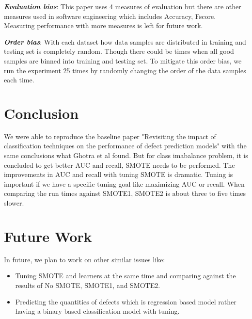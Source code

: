 \documentclass[sigconf]{acmart}
\theoremstyle{break}
\begin{document}
\textbf{\textit{Evaluation bias}}: This paper uses 4 measures of evaluation but there are other measures used in software engineering which includes Accuracy, Fscore. Measuring performance with more measures is left for future work.

\textbf{\textit{Order bias}}: With each dataset how data samples are distributed in training and testing set is completely random. Though there could be times when all good samples are binned into training and testing set. To mitigate this order bias, we run
the experiment 25 times by randomly changing the order of the data samples each time.

\section{Conclusion}
\label{sect:conclusion}

We were able to reproduce the baseline paper "Revisiting the impact of classification techniques on the performance of defect prediction models" with the same conclusions what Ghotra et al found. But for class imabalance problem, it is concluded to get better AUC and recall, SMOTE needs to be performed. The improvements in AUC and recall with tuning SMOTE is dramatic. Tuning is important if we have a specific tuning goal like maximizing AUC or recall. When comparing the run times against SMOTE1, SMOTE2 is about three to five times slower.

\section{Future Work}
\label{sect:future}
In future, we plan to work on other similar issues like:
\begin{itemize}
 \item Tuning SMOTE and learners at the same time and comparing against the results of No SMOTE, SMOTE1, and SMOTE2.
 \item Predicting the quantities of defects which is regression based model rather having a binary based classification model with tuning.
\end{itemize}

\balance


\medskip

\end{document}
